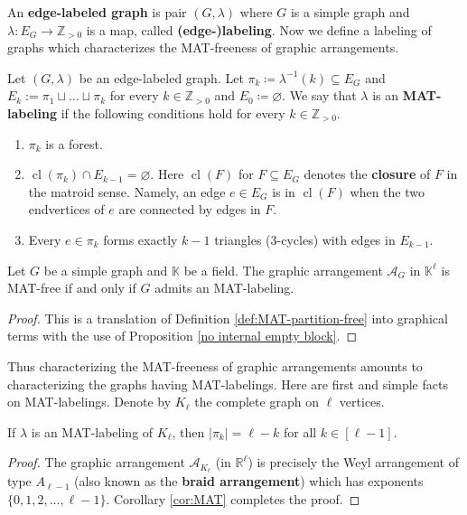 \documentclass[ALCO, Unicode,published]{cedram}
\newcommand{\R}{\mathbb{R}}
\newcommand{\K}{\mathbb{K}}
\DeclareMathOperator{\cl}{cl}
\newcommand{\A}{\mathcal{A}}
\begin{document}
An \textbf{edge-labeled graph} is pair $ (G,\lambda) $ where $ G $ is a simple graph and  $\mbox{$\lambda \colon E_{G} \to \mathbb{Z}_{>0}$}$ is a map, called \textbf{(edge-)labeling}. 
Now we define a labeling of graphs which characterizes the MAT-freeness of graphic arrangements.
\begin{definition}
\label{definition MAT-labeling}
Let $ (G,\lambda) $ be an  edge-labeled graph. 
Let $ \pi_{k} \coloneqq \lambda^{-1}(k) \subseteq E_{G}$ and $ E_{k} := \pi_{1} \sqcup \dots \sqcup \pi_{k} $ for every $ k \in \mathbb{Z}_{>0} $ and $ E_{0} \coloneqq \varnothing $. 
We say that $ \lambda $ is an \textbf{MAT-labeling} if the following conditions hold for every $ k \in \mathbb{Z}_{>0} $. 
\begin{enumerate}[(ML1)]
\item\label{definition MAT-labeling forest} $ \pi_{k} $ is a forest. 
\item\label{definition MAT-labeling closure} $ \cl(\pi_{k}) \cap E_{k-1} = \varnothing $. 
Here  $\cl(F)$ for $F \subseteq E_{G}$ denotes the \textbf{closure} of $F$ in the matroid sense. Namely,
an edge $e\in E_{G}$ is in $\cl(F)$ when the two endvertices of $e$ are connected by edges in $F$.
\item\label{definition MAT-labeling triangle} Every $ e \in \pi_{k} $ forms exactly $ k-1 $ triangles ($3$-cycles) with edges in $ E_{k-1} $. 
\end{enumerate}
\end{definition}

\begin{proposition}
\label{prop:MATF=MATL}
Let $G$ be a simple graph and $\K$ be a field. 
The graphic arrangement $\A_G$ in $\K^\ell$ is MAT-free if and only if $ G $ admits an MAT-labeling. 
\end{proposition}
\begin{proof}
This is a translation of Definition \ref{def:MAT-partition-free} into graphical terms with the use of Proposition \ref{no internal empty block}. 
\end{proof}

Thus characterizing the MAT-freeness of graphic arrangements amounts to characterizing the graphs having MAT-labelings. 
Here are first and simple facts on MAT-labelings.
Denote by $ K_{\ell} $ the complete graph on $ \ell $ vertices. 
\begin{proposition}\label{MAT-labeling on complete graph}
If $ \lambda $ is an MAT-labeling of $ K_{\ell} $, then $ |\pi_{k}| = \ell-k $ for all $ k \in [\ell-1] $. 
\end{proposition}
\begin{proof}
The graphic arrangement $ \mathcal{A}_{K_{\ell}} $ (in $\R^\ell$) is precisely the Weyl arrangement of type $A_{\ell-1}$ (also known as the \textbf{braid arrangement}) which has exponents $ \{0,1,2, \dots, \ell-1\}$.
Corollary \ref{cor:MAT} completes the proof.
\end{proof}
\end{document}
